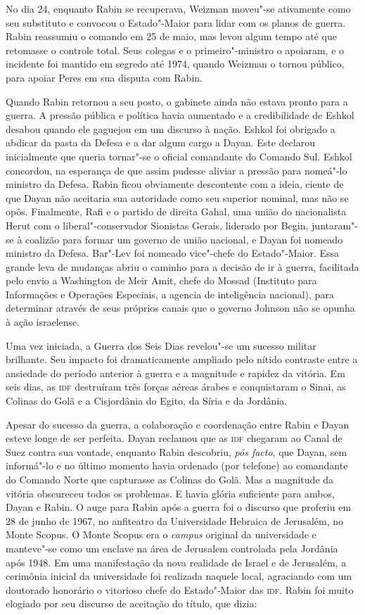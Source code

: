 No dia 24, enquanto Rabin se recuperava, Weizman moveu"-se ativamente
como seu substituto e convocou o Estado"-Maior para lidar com os planos
de guerra. Rabin reassumiu o comando em 25 de maio, mas levou algum
tempo até que retomasse o controle total. Seus colegas e o primeiro"-ministro
o apoiaram, e o incidente foi mantido em segredo até 1974,
quando Weizman o tornou público, para apoiar Peres em sua disputa com
Rabin.

Quando Rabin retornou a seu posto, o gabinete ainda não estava pronto
para a guerra. A pressão pública e política havia aumentado e a
credibilidade de Eshkol desabou quando ele gaguejou em um discurso à nação.
Eshkol foi obrigado a abdicar da pasta da Defesa e a dar algum cargo a
Dayan. Este declarou inicialmente que queria tornar"-se o oficial
comandante do Comando Sul. Eshkol concordou, na esperança de que assim
pudesse aliviar a pressão para nomeá"-lo ministro da Defesa. Rabin ficou
obviamente descontente com a ideia, ciente de que Dayan não aceitaria
sua autoridade como seu superior nominal, mas não se opôs. Finalmente,
Rafi e o partido de direita Gahal, uma união do nacionalista Herut com o
liberal"-conservador Sionistas Gerais, liderado por Begin, juntaram"-se à
coalizão para formar um governo de união nacional, e Dayan foi nomeado
ministro da Defesa. Bar"-Lev foi nomeado vice"-chefe do Estado"-Maior. Essa
grande leva de mudanças abriu o caminho para a decisão de ir à guerra,
facilitada pelo envio a Washington de Meir Amit, chefe do Mossad (Instituto para Informações e Operações Especiais, a
agencia de inteligência nacional), para determinar através de seus
próprios canais que o governo Johnson não se opunha à ação israelense.

Uma vez iniciada, a Guerra dos Seis Dias revelou"-se um sucesso militar
brilhante. Seu impacto foi dramaticamente ampliado pelo nítido contraste
entre a ansiedade do período anterior à guerra e a magnitude e rapidez
da vitória. Em seis dias, as \textsc{idf} destruíram três forças aéreas árabes e
conquistaram o Sinai, as Colinas do Golã e a Cisjordânia do Egito, da
Síria e da Jordânia.

Apesar do sucesso da guerra, a colaboração e coordenação entre Rabin e
Dayan esteve longe de ser perfeita. Dayan reclamou que as \textsc{idf} chegaram
ao Canal de Suez contra sua vontade, enquanto Rabin descobriu, \emph{pós
facto}, que Dayan, sem informá"-lo e no último momento havia ordenado
(por telefone) ao comandante do Comando Norte que capturasse as Colinas
do Golã. Mas a magnitude da vitória obscureceu todos os problemas. E
havia glória suficiente para ambos, Dayan e Rabin. O auge para Rabin
após a guerra foi o discurso que proferiu em 28 de junho de 1967, no
anfiteatro da Universidade Hebraica de Jerusalém, no Monte Scopus. O
Monte Scopus era o \emph{campus} original da universidade e manteve"-se como um
enclave na área de Jerusalem controlada pela Jordânia após 1948. Em uma
manifestação da nova realidade de Israel e de Jerusalém, a cerimônia
inicial da universidade foi realizada naquele local, agraciando com um
doutorado honorário o vitorioso chefe do Estado"-Maior das \textsc{idf}. Rabin foi
muito elogiado por seu discurso de aceitação do título, que dizia:

